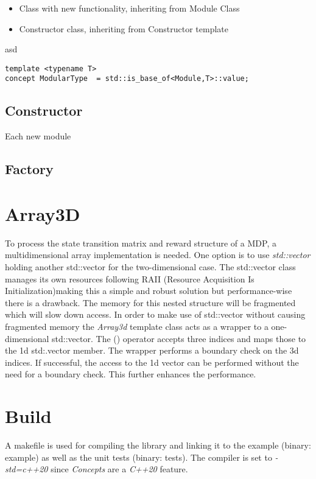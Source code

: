 \begin{itemize}
	\item Class with new functionality, inheriting from Module Class
	\item Constructor class, inheriting from Constructor template
\end{itemize}


asd
\begin{lstlisting}
template <typename T>
concept ModularType  = std::is_base_of<Module,T>::value;
\end{lstlisting}

\subsection{Constructor}
Each new module 


\subsection{Factory}


\section{Array3D}

To process the state transition matrix and reward structure of a MDP, a multidimensional array implementation is needed. One option is to use \emph{std::vector} holding another std::vector for the two-dimensional case. The std::vector class manages its own resources following RAII (Resource Acquisition Is Initialization)making this a simple and robust solution but performance-wise there is a drawback. The memory for this nested structure will be fragmented which will slow down access. 
In order to make use of std::vector without causing fragmented memory the \emph{Array3d} template class acts as a wrapper to a one-dimensional std::vector. The () operator accepts three indices and maps those to the 1d std:.vector member. The wrapper performs a boundary check on the 3d indices. If successful, the access to the 1d vector can be performed without the need for a boundary check. This further enhances the performance.  

\section{Build}

A makefile is used for compiling the library and linking it to the example (binary: example) as well as the unit tests (binary: tests). The compiler is set to \emph{-std=c++20} since \emph{Concepts} are a \emph{C++20} feature. 

